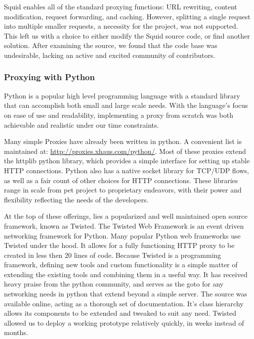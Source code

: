 \documentclass[12pt]{article}
\begin{document}
			Squid enables all of the standard proxying functions: URL rewriting, content modification, request forwarding, and caching. However, splitting a single request into multiple smaller requests, a necessity for the project, was not supported. This left us with a choice to either modify the Squid source code, or find another solution. After examining the source, we found that the code base was undesirable, lacking an active and excited community of contributors.

		\subsubsection{Proxying with Python}

			Python is a popular high level programming language with a standard library that can accomplish both small and large scale needs. With the language's focus on ease of use and readability, implementing a proxy from scratch was both achievable and realistic under our time constraints.

			Many simple Proxies have already been written in python. A convenient list is maintained at: \url{http://proxies.xhaus.com/python/}. Most of these proxies extend the httplib python library, which provides a simple interface for setting up stable HTTP connections. Python also has a native socket library for TCP/UDP flows, as well as a fair count of other choices for HTTP connections. These libraries range in scale from pet project to proprietary endeavors, with their power and flexibility reflecting the needs of the developers.
			
			At the top of these offerings, lies a popularized and well maintained open source framework, known as Twisted. The Twisted Web Framework is an event driven networking framework for Python. Many popular Python web frameworks use Twisted under the hood. It allows for a fully functioning HTTP proxy to be created in less then 20 lines of code. Because Twisted is a programming framework, defining new tools and custom functionality is a simple matter of extending the existing tools and combining them in a useful way. It has received heavy praise from the python community, and serves as the goto for any networking needs in python that extend beyond a simple server. The source was available online, acting as a thorough set of documentation. It's class hierarchy allows its components to be extended and tweaked to suit any need. Twisted allowed us to deploy a working prototype relatively quickly, in weeks instead of months.
\end{document}
